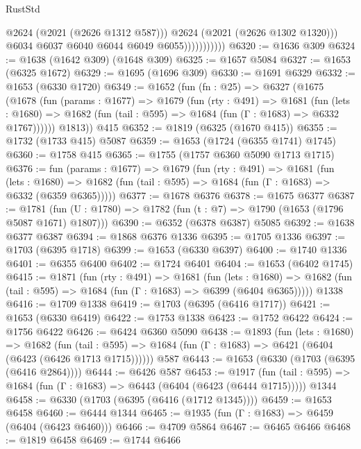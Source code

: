 \begin{lexlean}{RustStd}
\begin{coremodule}
{\begin{coremodule}
{{{{{{{{{{{{{{{{                              @2624
                              (@2021 (@2626 @1312 @587)))
                            @2624
                            (@2021 (@2626 @1302 @1320)))
                          @6034
                          @6037
                          @6040
                          @6044
                          @6049
                          @6055)))))))))))
@6320 := @1636 @309
@6324 := @1638 (@1642 @309) (@1648 @309)
@6325 := @1657 @5084
@6327 := @1653 (@6325 @1672)
@6329 := @1695 (@1696 @309)
@6330 := @1691 @6329
@6332 := @1653 (@6330 @1720)
@6349 := @1652
    (fun (fn : @25) =>
    @6327
      (@1675
        (@1678
          (fun (params : @1677) =>
          @1679
            (fun (rty : @491) =>
            @1681
              (fun (lets : @1680) =>
              @1682 (fun (tail : @595) => @1684 (fun (Γ : @1683) => @6332 @1767))))))
        @1813))
    @415
@6352 := @1819 (@6325 (@1670 @415))
@6355 := @1732 (@1733 @415) @5087
@6359 := @1653 (@1724 (@6355 @1741) @1745)
@6360 := @1758 @415
@6365 := @1755 (@1757 @6360 @5090 @1713 @1715)
@6376 := fun (params : @1677) =>
  @1679
    (fun (rty : @491) =>
    @1681
      (fun (lets : @1680) =>
      @1682 (fun (tail : @595) => @1684 (fun (Γ : @1683) => @6332 (@6359 @6365)))))
@6377 := @1678 @6376
@6378 := @1675 @6377
@6387 := @1781 (fun (U : @1780) => @1782 (fun (t : @7) => @1790 (@1653 (@1796 @5087 @1671) @1807)))
@6390 := @6352 (@6378 @6387) @5085
@6392 := @1638 @6377 @6387
@6394 := @1868 @6376 @1336
@6395 := @1705 @1336
@6397 := @1703 (@6395 @1718)
@6399 := @1653 (@6330 @6397)
@6400 := @1740 @1336
@6401 := @6355 @6400
@6402 := @1724 @6401
@6404 := @1653 (@6402 @1745)
@6415 := @1871
    (fun (rty : @491) =>
    @1681
      (fun (lets : @1680) =>
      @1682 (fun (tail : @595) => @1684 (fun (Γ : @1683) => @6399 (@6404 @6365)))))
    @1338
@6416 := @1709 @1338
@6419 := @1703 (@6395 (@6416 @1717))
@6421 := @1653 (@6330 @6419)
@6422 := @1753 @1338
@6423 := @1752 @6422
@6424 := @1756 @6422
@6426 := @6424 @6360 @5090
@6438 := @1893
    (fun (lets : @1680) =>
    @1682
      (fun (tail : @595) => @1684 (fun (Γ : @1683) => @6421 (@6404 (@6423 (@6426 @1713 @1715))))))
    @587
@6443 := @1653 (@6330 (@1703 (@6395 (@6416 @2864))))
@6444 := @6426 @587
@6453 := @1917
    (fun (tail : @595) => @1684 (fun (Γ : @1683) => @6443 (@6404 (@6423 (@6444 @1715)))))
    @1344
@6458 := @6330 (@1703 (@6395 (@6416 (@1712 @1345))))
@6459 := @1653 @6458
@6460 := @6444 @1344
@6465 := @1935 (fun (Γ : @1683) => @6459 (@6404 (@6423 @6460)))
@6466 := @4709 @5864
@6467 := @6465 @6466
@6468 := @1819 @6458
@6469 := @1744 @6466
}}}}}}}}}}}}}}}}
\end{coremodule}}
\end{coremodule}
\end{lexlean}

